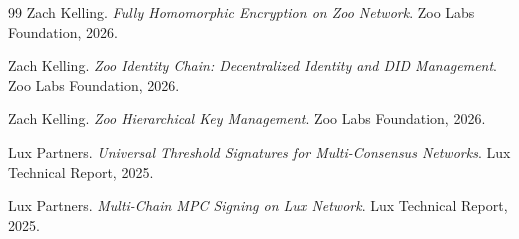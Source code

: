 \documentclass[11pt,letterpaper]{article}
\theoremstyle{definition}
\theoremstyle{remark}
\begin{document}
\begin{thebibliography}{99}
Zach Kelling.
\textit{Fully Homomorphic Encryption on Zoo Network}.
Zoo Labs Foundation, 2026.

Zach Kelling.
\textit{Zoo Identity Chain: Decentralized Identity and DID Management}.
Zoo Labs Foundation, 2026.

Zach Kelling.
\textit{Zoo Hierarchical Key Management}.
Zoo Labs Foundation, 2026.

Lux Partners.
\textit{Universal Threshold Signatures for Multi-Consensus Networks}.
Lux Technical Report, 2025.

Lux Partners.
\textit{Multi-Chain MPC Signing on Lux Network}.
Lux Technical Report, 2025.

\end{thebibliography}
\end{document}
